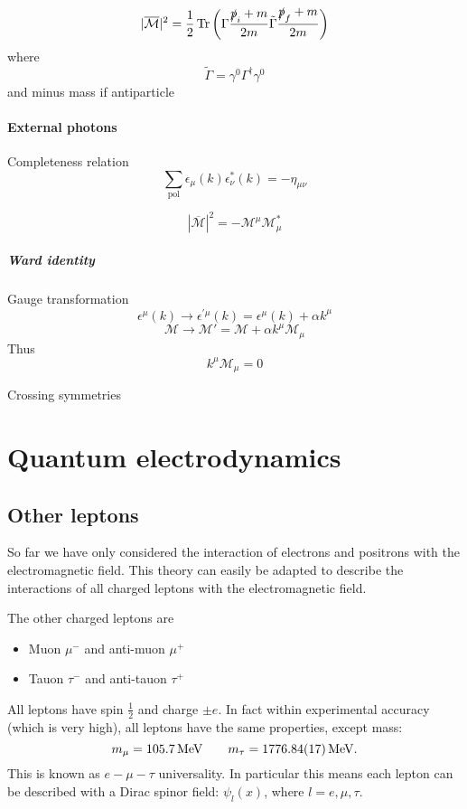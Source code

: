 \[ |\overline{\mathcal{M}}|^2 = \frac{1}{2}\operatorname{Tr} \left(\Gamma \frac{\slashed{p}_i + m}{2m}\tilde{\Gamma}\frac{\slashed{p}_f + m}{2m}\right) \]
where
\[ \tilde{\Gamma} = \gamma^0\Gamma^\dagger \gamma^0 \]
and minus mass if antiparticle

\subsubsection{External photons}
Completeness relation
\[\sum_\text{pol} \epsilon_\mu(k)\epsilon^*_\nu(k) = -\eta_{\mu\nu}\]

\[ |\overline{\mathcal{M}}|^2 = - \mathcal{M}^\mu\mathcal{M}^*_\mu \]
\paragraph{Ward identity}
Gauge transformation
\[ \epsilon^\mu(k) \to \epsilon^{\prime\mu}(k) = \epsilon^\mu(k) + \alpha k^\mu \]
\[\mathcal{M} \to \mathcal{M}' = \mathcal{M} + \alpha k^\mu\mathcal{M}_\mu\]
Thus
\[ k^\mu \mathcal{M}_\mu = 0 \]

Crossing symmetries

\chapter{Quantum electrodynamics}

\section{Other leptons}
So far we have only considered the interaction of electrons and positrons with the electromagnetic field. This theory can easily be adapted to describe the interactions of all charged leptons with the electromagnetic field.

The other charged leptons are
\begin{itemize}
\item Muon $\mu^-$ and anti-muon $\mu^+$
\item Tauon $\tau^-$ and anti-tauon $\tau^+$
\end{itemize}
All leptons have spin $\frac{1}{2}$ and charge $\pm e$. In fact within experimental accuracy (which is very high), all leptons have the same properties, except mass:
\[ m_\mu = \SI{105.7}{MeV} \qquad m_\tau = \SI{1776.84\pm0.17}{MeV}. \]
This is known as $e-\mu-\tau$ universality. In particular this means each lepton can be described with a Dirac spinor field: $\psi_l(x)$, where $l=e,\mu,\tau$.

